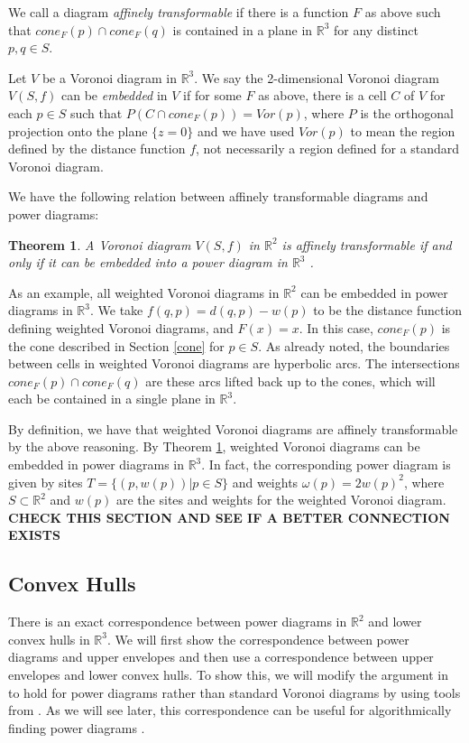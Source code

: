 \documentclass[a4paper, 11pt]{article}
\newtheorem{theorem}{Theorem}[section]
\newcommand{\R}{\mathbb{R}}
\begin{document}
We call a diagram \textit{affinely transformable} if there is a function $F$ as above such that $cone_F(p) \cap cone_F(q)$ is contained in a plane in $\R^3$ for any distinct
$p,q \in S$.

Let $V$ be a Voronoi diagram in $\R^3$. We say the 2-dimensional Voronoi diagram $V(S,f)$ can be \textit{embedded} in $V$ if for some $F$ as above,
there is a cell $C$ of $V$ for each $p \in S$ such that $P( C \cap cone_F(p)) = Vor(p)$, where $P$ is the orthogonal projection onto the plane $\{ z =
0 \}$ and we have used $Vor(p)$ to mean the region defined
by the distance function $f$, not necessarily a region defined for a standard Voronoi diagram.

We have the following relation between affinely transformable diagrams and power diagrams:

\begin{theorem}
  \label{thm:affine}
  A Voronoi diagram $V(S,f)$ in $\R^2$ is affinely transformable if and only if it can be embedded into a power diagram in $\R^3$
  \cite{aurenhammer_additive}.
\end{theorem}

As an example, all weighted Voronoi diagrams in $\R^2$ can be embedded in power diagrams in $\R^3$. We take $f(q,p) = d(q,p) - w(p)$ to be the
distance function defining weighted Voronoi diagrams, and $F(x) = x$. In this case, $cone_F(p)$ is the cone described in Section \ref{cone} for $p \in
S$. As already noted, the boundaries between cells in weighted Voronoi diagrams are hyperbolic arcs. The intersections $cone_F(p) \cap cone_F(q)$
are these arcs lifted back up to
the cones, which will each be contained in a single plane in $\R^3$.

By definition, we have that weighted Voronoi diagrams are affinely transformable by the above reasoning. By Theorem \ref{thm:affine}, weighted Voronoi
diagrams can be embedded in power diagrams in $\R^3$. In fact, the corresponding power diagram is given by sites $T = \{ (p, w(p)) | p \in S \}$ and
weights $\omega(p) = 2 w(p)^2$, where $S \subset \R^2$ and $w(p)$ are the sites and weights for the weighted Voronoi diagram. \textbf{CHECK THIS
SECTION AND SEE IF A BETTER CONNECTION EXISTS}

\subsection{Convex Hulls}
\label{sec:conv}

There is an exact correspondence between power diagrams in $\R^2$ and lower convex hulls in $\R^3$. We will first show the correspondence between power diagrams and
upper envelopes and then use a correspondence between upper envelopes and lower convex hulls. To show this, we will modify the argument in
\cite{comp_geom} to hold for power diagrams rather than standard Voronoi diagrams by using tools from \cite{aurenhammer_power}. As we will see later, this correspondence can be useful
for algorithmically finding power diagrams \cite{aurenhammer_power}.
\end{document}
